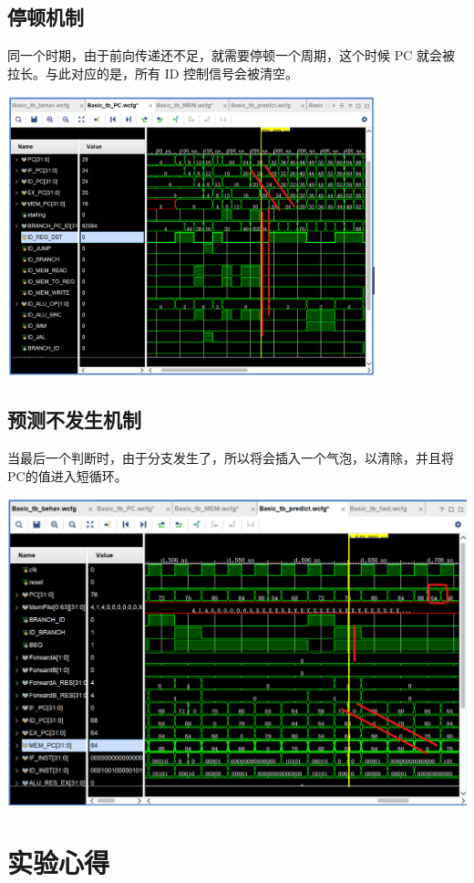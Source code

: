 \documentclass[a4paper,UTF8]{ctexart}
\begin{document}
\subsection{停顿机制}

同一个时期，由于前向传递还不足，就需要停顿一个周期，这个时候 PC 就会被拉长。与此对应的是，所有 ID 控制信号会被清空。

\includegraphics[width=0.8\textwidth]{stalling.png}

\subsection{预测不发生机制}

当最后一个判断时，由于分支发生了，所以将会插入一个气泡，以清除，并且将PC的值进入短循环。

\includegraphics[width=\textwidth]{pnt.png}

\section{实验心得}
\end{document}
